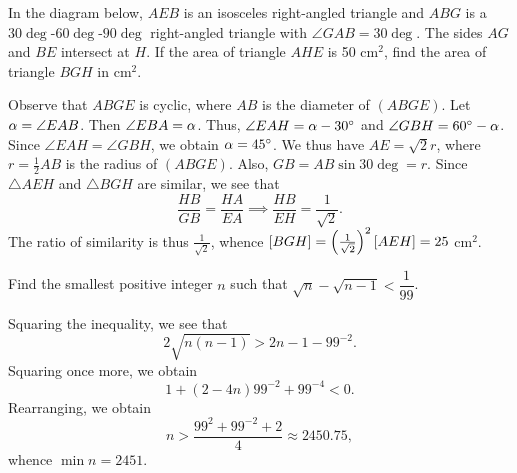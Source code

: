 \begin{question}[25]\label{Q::2024-J-1-16}
    In the diagram below, $AEB$ is an isosceles right-angled triangle and $ABG$ is a $30\deg$-$60\deg$-$90\deg$ right-angled triangle with $\angle GAB = 30\deg$. The sides $AG$ and $BE$ intersect at $H$. If the area of triangle $AHE$ is 50 cm$^2$, find the area of triangle $BGH$ in cm$^2$.

    \begin{center}
    \end{center}
\end{question}
\begin{solution*}
    Observe that $ABGE$ is cyclic, where $AB$ is the diameter of $(ABGE)$. Let $\alpha = \angle EAB$. Then $\angle EBA = \alpha$. Thus, $\angle EAH = \alpha - 30^{\circ}$ and $\angle GBH = 60^{\circ} - \alpha$. Since $\angle EAH = \angle GBH$, we obtain $\alpha = 45^{\circ}$. We thus have $AE = \sqrt2 r$, where $r = \frac12 AB$ is the radius of $(ABGE)$. Also, $GB = AB \sin 30\deg = r$. Since $\triangle AEH$ and $\triangle BGH$ are similar, we see that \[\frac{HB}{GB} = \frac{HA}{EA} \implies \frac{HB}{EH} = \frac1{\sqrt2}.\] The ratio of similarity is thus $\frac1{\sqrt2}$, whence $[BGH] = \left( \frac1{\sqrt2} \right)^2 [AEH] = 25$ cm$^2$.
\end{solution*}

\begin{question}[2451]\label{Q::2024-J-1-17}
    Find the smallest positive integer $n$ such that $\sqrt{n} - \sqrt{n - 1} < \dfrac1{99}$.
\end{question}
\begin{solution*}
    Squaring the inequality, we see that \[2\sqrt{n(n-1)} > 2n - 1 - 99^{-2}.\] Squaring once more, we obtain \[1 + (2 - 4n)99^{-2} + 99^{-4} < 0.\] Rearranging, we obtain \[n > \frac{99^2 + 99^{-2} + 2}{4} \approx 2450.75,\] whence $\min n = 2451$.
\end{solution*}

